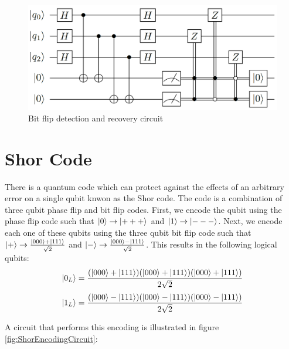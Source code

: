 \begin{figure}[h!]
    \centering
    \includegraphics[scale=.25]{images/ErrorCorrection-PhaseFlipDetectionAndRecoveryCircuit.png}
    \caption{Bit flip detection and recovery circuit \cite{ThomasWong_2022}}
    \label{fig:PhaseFlipDetectionAndRecoveryCircuit}
\end{figure}

\section{Shor Code}

There is a quantum code which can protect against the effects of an arbitrary error on a single qubit knwon as the Shor code. The code is a combination of three qubit phase flip and bit flip codes. First, we encode the qubit using the phase flip code such that $\left|{0}\right\rangle \rightarrow \left|{+++}\right\rangle$ and $\left|{1}\right\rangle \rightarrow \left|{---}\right\rangle$. Next, we encode each one of these qubits using the three qubit bit flip code such that $\left|{+}\right\rangle \rightarrow \frac{\left|{000}\right\rangle+\left|{111}\right\rangle}{\sqrt{2}}$ and $\left|{-}\right\rangle \rightarrow \frac{\left|{000}\right\rangle-\left|{111}\right\rangle}{\sqrt{2}}$. This results in the following logical qubits:
$$\left|{0_L}\right\rangle=\frac{(\left|{000}\right\rangle+\left|{111}\right\rangle)(\left|{000}\right\rangle+\left|{111}\right\rangle)(\left|{000}\right\rangle+\left|{111}\right\rangle)}{2\sqrt{2}}$$
$$\left|{1_L}\right\rangle=\frac{(\left|{000}\right\rangle-\left|{111}\right\rangle)(\left|{000}\right\rangle-\left|{111}\right\rangle)(\left|{000}\right\rangle-\left|{111}\right\rangle)}{2\sqrt{2}}$$

A circuit that performs this encoding is illustrated in figure \ref{fig:ShorEncodingCircuit}:

